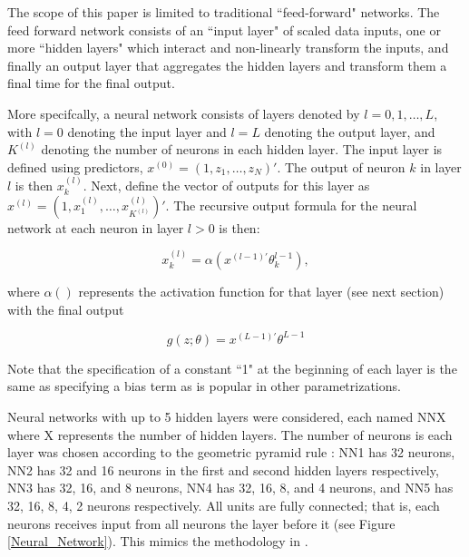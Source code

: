 \documentclass[a4paper, table]{article}
\begin{document}
The scope of this paper is limited to traditional ``feed-forward" networks. The feed forward network consists of an ``input layer" of scaled data inputs, one or more ``hidden layers" which interact and non-linearly transform the inputs, and finally an output layer that aggregates the hidden layers and transform them a final time for the final output. 

More specifcally, a neural network consists of layers denoted by $l = 0, 1, \dots, L$, with $l = 0$ denoting the input layer and $l = L$ denoting the output layer, and $K^{(l)}$ denoting the number of neurons in each hidden layer. The input layer is defined using predictors, $x^{(0)} = (1, z_1, \dots, z_N)'$. The output of neuron $k$ in layer $l$ is then $x_k^{(l)}$. Next, define the vector of outputs for this layer as $x^{(l)} = (1, x_1^{(l)}, \dots, x_{K^(l)}^{(l)})'$.  The recursive output formula for the neural network at each neuron in layer $l > 0$ is then:

\begin{equation}
x_k^{(l)} = \alpha(x^{(l-1)'}\theta_k^{l-1}),
\end{equation}

where $\alpha()$ represents the activation function for that layer (see next section) with the final output

\begin{equation}
g(z;\theta) = x^{(L-1)'}\theta^{L-1}
\end{equation}

Note that the specification of a constant ``1" at the beginning of each layer is the same as specifying a bias term as is popular in other parametrizations. 

Neural networks with up to 5 hidden layers were considered, each named NNX where X represents the number of hidden layers. The number of neurons is each layer was chosen according to the geometric pyramid rule \citep{masters_practical_1993}: NN1 has 32 neurons, NN2 has 32 and 16 neurons in the first and second hidden layers respectively, NN3 has 32, 16, and 8 neurons, NN4 has 32, 16, 8, and 4 neurons, and NN5 has 32, 16, 8, 4, 2 neurons respectively. All units are fully connected; that is, each neurons receives input from all neurons the layer before it (see Figure \ref{Neural_Network}). This mimics the methodology in \cite{gu_empirical_2018}.
\end{document}
